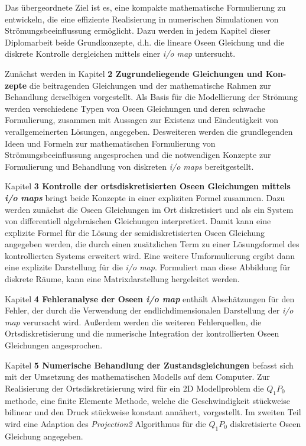 \documentclass[a4paper,10pt,BCOR=15mm]{scrbook}
\begin{document}
Das übergeordnete Ziel ist es, eine kompakte mathematische Formulierung zu entwickeln, die eine effiziente Realisierung in numerischen Simulationen von Strömungsbeeinflussung ermöglicht. Dazu werden in jedem Kapitel dieser Diplomarbeit beide Grundkonzepte, d.h. die lineare Oseen Gleichung und die diskrete Kontrolle dergleichen mittels einer \textit{i/o map} untersucht.

Zunächst werden in Kapitel \textbf{2 Zugrundeliegende Gleichungen und Kon- zepte} die beitragenden Gleichungen und der mathematische Rahmen zur Behandlung derselbigen vorgestellt. Als Basis für die Modellierung der Strömung werden verschiedene Typen von Oseen Gleichungen und deren schwache Formulierung, zusammen mit Aussagen zur Existenz und Eindeutigkeit von verallgemeinerten Lösungen, angegeben. Desweiteren werden die grundlegenden Ideen und Formeln zur mathematischen Formulierung von Strömungsbeeinflussung angesprochen und die notwendigen Konzepte zur Formulierung und Behandlung von diskreten \textit{i/o maps} bereitgestellt.

Kapitel \textbf{3 Kontrolle der ortsdiskretisierten Oseen Gleichungen mittels \textit{i/o maps}} bringt beide Konzepte in einer expliziten Formel zusammen. Dazu werden zunächst die Oseen Gleichungen im Ort diskretisiert und als ein System von differentiell algebraischen Gleichungen interpretiert. Damit kann eine explizite Formel für die Lösung der semidiskretisierten Oseen Gleichung angegeben werden, die durch einen zusätzlichen Term zu einer Lösungsformel des kontrollierten Systems erweitert wird. Eine weitere Umformulierung ergibt dann eine explizite Darstellung für die\textit{ i/o map}. Formuliert man diese Abbildung für diskrete Räume, kann eine Matrixdarstellung hergeleitet werden.

Kapitel \textbf{4 Fehleranalyse der Oseen \textit{i/o map}} enthält Abschätzungen für den Fehler, der durch die Verwendung der endlichdimensionalen Darstellung der \textit{i/o map} verursacht wird. Außerdem werden die weiteren Fehlerquellen, die Ortsdiskretisierung und die numerische Integration der kontrollierten Oseen Gleichungen angesprochen.

Kapitel \textbf{5 Numerische Behandlung der Zustandsgleichungen} befasst sich mit der Umsetzung des mathematischen Modells auf dem Computer. Zur Realisierung der Ortsdiskretisierung wird für ein 2D Modellproblem die $Q_1P_0$ methode, eine finite Elemente Methode, welche die Geschwindigkeit stückweise bilinear und den Druck stückweise konstant annähert, vorgestellt. Im zweiten Teil wird eine Adaption des \textit{Projection2} Algorithmus für die $Q_1P_0$ diskretisierte Oseen Gleichung angegeben. 
\end{document}
